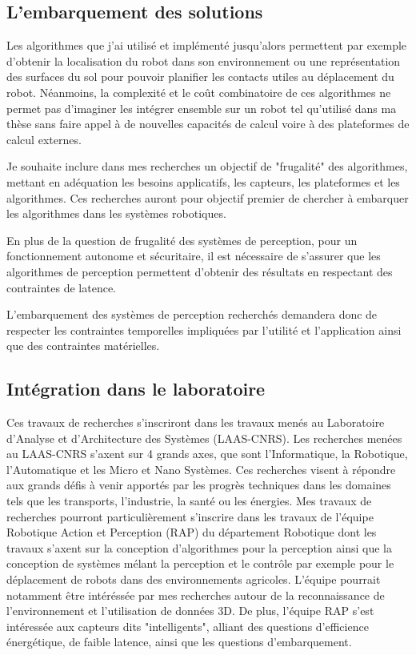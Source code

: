 \documentclass[11pt,a4paper,sans]{moderncv}         %
\begin{document}
\subsection{L'embarquement des solutions}

Les algorithmes que j'ai utilisé et implémenté jusqu'alors permettent par exemple d'obtenir la localisation du robot dans son environnement ou une représentation des surfaces du sol pour pouvoir planifier les contacts utiles au déplacement du robot. Néanmoins, la complexité et le coût combinatoire de ces algorithmes ne permet pas d'imaginer les intégrer ensemble sur un robot tel qu'utilisé dans ma thèse sans faire appel à de nouvelles capacités de calcul voire à des plateformes de calcul externes.

Je souhaite inclure dans mes recherches un objectif de "frugalité" des algorithmes, mettant en adéquation les besoins applicatifs, les capteurs, les plateformes et les algorithmes. Ces recherches auront pour objectif premier de chercher à embarquer les algorithmes dans les systèmes robotiques.

En plus de la question de frugalité des systèmes de perception, pour un fonctionnement autonome et sécuritaire, il est nécessaire de s'assurer que les algorithmes de perception permettent d'obtenir des résultats en respectant des contraintes de latence.

L'embarquement des systèmes de perception recherchés demandera donc de respecter les contraintes temporelles impliquées par l'utilité et l'application ainsi que des contraintes matérielles.

\subsection{Intégration dans le laboratoire}

Ces travaux de recherches s'inscriront dans les travaux menés au Laboratoire d'Analyse et d'Architecture des Systèmes (LAAS-CNRS). Les recherches menées au LAAS-CNRS s'axent sur 4 grands axes, que sont l'Informatique, la Robotique, l'Automatique et les Micro et Nano Systèmes. Ces recherches visent à répondre aux grands défis à venir apportés par les progrès techniques dans les domaines tels que les transports, l'industrie, la santé ou les énergies. Mes travaux de recherches pourront particulièrement s'inscrire dans les travaux de l'équipe Robotique Action et Perception (RAP) du département Robotique dont les travaux s'axent sur la conception d'algorithmes pour la perception ainsi que la conception de systèmes mélant la perception et le contrôle par exemple pour le déplacement de robots dans des environnements agricoles. L'équipe pourrait notamment être intéréssée par mes recherches autour de la reconnaissance de l'environnement et l'utilisation de données 3D. De plus, l'équipe RAP s'est intéressée aux capteurs dits "intelligents", alliant des questions d'efficience énergétique, de faible latence, ainsi que les questions d'embarquement.
\end{document}
